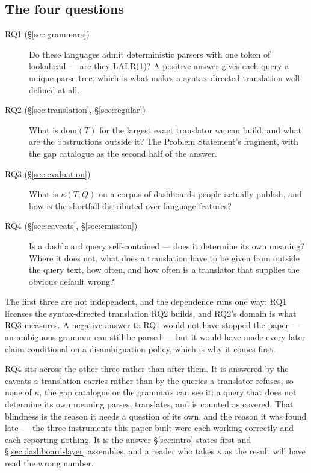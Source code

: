 \subsection{The four questions}

\begin{description}
\item[RQ1 (\S\ref{sec:grammars})] Do these languages admit deterministic parsers with
one token of lookahead --- are they LALR(1)? A positive answer gives each query a unique
parse tree, which is what makes a syntax-directed translation well defined at all.
\item[RQ2 (\S\ref{sec:translation}, \S\ref{sec:regular})] What is $\mathrm{dom}(T)$ for
the largest exact translator we can build, and what are the obstructions outside it? The
Problem Statement's fragment, with the gap catalogue as the second half of the answer.
\item[RQ3 (\S\ref{sec:evaluation})] What is $\kappa(T,Q)$ on a corpus of dashboards
people actually publish, and how is the shortfall distributed over language features?
\item[RQ4 (\S\ref{sec:caveats}, \S\ref{sec:emission})] Is a dashboard query
self-contained --- does it determine its own meaning? Where it does not, what does a
translation have to be given from outside the query text, how often, and how often is a
translator that supplies the obvious default wrong?
\end{description}

\noindent
The first three are not independent, and the dependence runs one way: RQ1 licenses the
syntax-directed translation RQ2 builds, and RQ2's domain is what RQ3 measures. A negative
answer to RQ1 would not have stopped the paper --- an ambiguous grammar can still be
parsed --- but it would have made every later claim conditional on a disambiguation
policy, which is why it comes first.

RQ4 sits across the other three rather than after them. It is answered by the caveats a
translation carries rather than by the queries a translator refuses, so none of
$\kappa$, the gap catalogue or the grammars can see it: a query that does not determine
its own meaning parses, translates, and is counted as covered. That blindness is the
reason it needs a question of its own, and the reason it was found late --- the three
instruments this paper built were each working correctly and each reporting nothing. It
is the answer \S\ref{sec:intro} states first and \S\ref{sec:dashboard-layer} assembles,
and a reader who takes $\kappa$ as the result will have read the wrong number.

